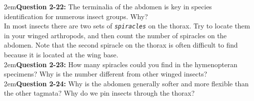 \documentclass[letterpaper, 11pt]{article}
\newcommand{\latinword}[1]{\texttt{\itshape #1}}%
\begin{document}
\hangindent2em\textbf{Question 2-22:} The terminalia of the abdomen is key in species identification for numerous insect groups. Why? \\

\noindent{}In most insects there are two sets of \latinword{spiracles} on the thorax. Try to locate them in your winged arthropods, and then count the number of spiracles on the abdomen. Note that the second spiracle on the thorax is often difficult to find because it is located at the wing base. \\

\hangindent2em\textbf{Question 2-23:} How many spiracles could you find in the hymenopteran specimens? Why is the number different from other winged insects?\\

\hangindent2em\textbf{Question 2-24:} Why is the abdomen generally softer and more flexible than the other tagmata? Why do we pin insects through the thorax?
\end{document}
